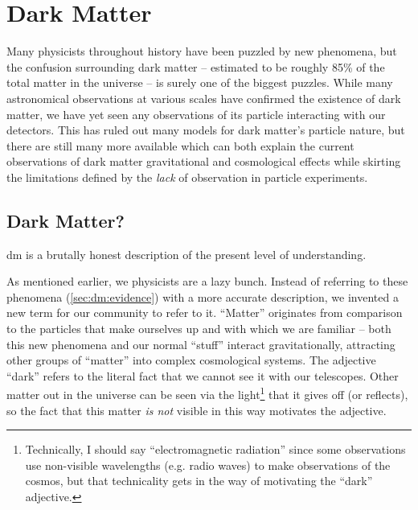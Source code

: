 \chapter{Dark Matter}
\label{chapter:dm}

Many physicists throughout history have been puzzled by new phenomena, but the confusion
surrounding dark matter -- estimated to be roughly 85\% of the total matter in the universe -- is
surely one of the biggest puzzles. While many astronomical observations at various scales have
confirmed the existence of dark matter, we have yet seen any observations of its particle
interacting with our detectors. This has ruled out many models for dark matter's particle nature,
but there are still many more available which can both explain the current observations of dark
matter gravitational and cosmological effects while skirting the limitations defined by the
\emph{lack} of observation in particle experiments.

\section{Dark Matter?}
\begin{todoenv}
  \ac{dm} is a brutally honest description of the present level of understanding.
\end{todoenv}
As mentioned earlier, we physicists are a lazy bunch. Instead of referring to these phenomena
(\cref{sec:dm:evidence}) with a more accurate description, we invented a new term for our community
to refer to it. ``Matter'' originates from comparison to the particles that make ourselves up and
with which we are familiar -- both this new phenomena and our normal ``stuff'' interact gravitationally, 
attracting other groups of ``matter''
into complex cosmological systems. The adjective ``dark'' refers to the literal fact that we cannot
see it with our telescopes. Other matter out in the universe can be seen via the light\footnote{
  Technically, I should say ``electromagnetic radiation'' since some observations use non-visible
  wavelengths (e.g. radio waves) to make observations of the cosmos, but that technicality gets in
  the way of motivating the ``dark'' adjective. } that it gives off (or reflects), so the fact that
this matter \emph{is not} visible in this way motivates the adjective.

